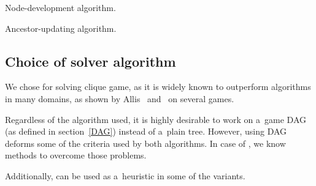 \begin{table}
    \begin{itemize*}
    \item [] 
    \item [] 
      \begin{itemize*}
      \item [] 
      \item [] 
      \end{itemize*}
    \item [] 
    \end{itemize*}
\caption{Node-development algorithm.}
\label{developNode}
\end{table}

\begin{table}
    \begin{itemize*}
    \item [] 
      \begin{itemize*}
      \item [] 
      \item [] 
      \end{itemize*}
    \item [] 
    \end{itemize*}
\caption{Ancestor-updating algorithm.}
\label{updateAncestors}
\end{table}


\subsection{Choice of solver algorithm}

We chose  for solving clique game, as it is widely known to outperform 
algorithms in many domains, as shown by Allis~\cite{allis} and~\cite{divne} on several games. 

Regardless of the algorithm used, it is highly desirable to work on a~game DAG
(as defined in section~\ref{DAG}) instead of a~plain tree. However, using DAG deforms some
of the criteria used by both algorithms. In case of , we know methods to
overcome those problems.

Additionally,  can be used as a~heuristic in some of the  variants.


